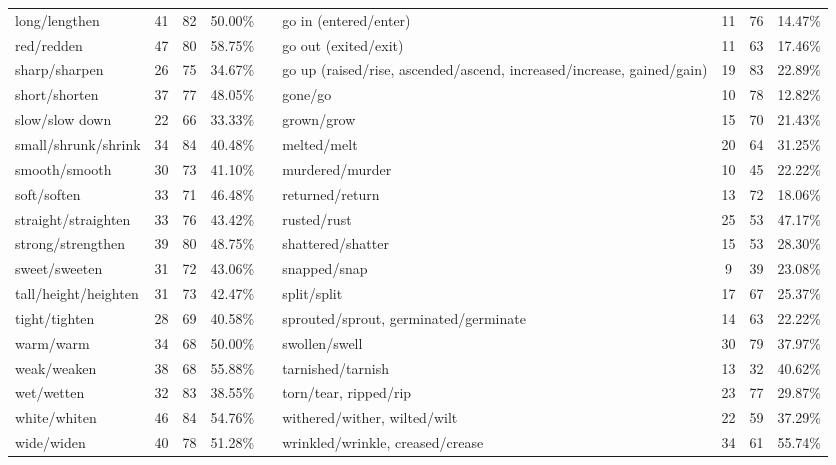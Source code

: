 \begin{tabular}{p{3cm}ccccp{3cm}ccc}
long/lengthen & 41 & 82 & 50.00\% & & go in (entered/enter) & 11 & 76 & 14.47\% \\
red/redden & 47 & 80 & 58.75\% & & go out (exited/exit) & 11 & 63 & 17.46\% \\
sharp/sharpen & 26 & 75 & 34.67\% & & go up (raised/rise, ascended/ascend, increased/increase, gained/gain) & 19 & 83 & 22.89\% \\
short/shorten & 37 & 77 & 48.05\% & & gone/go & 10 & 78 & 12.82\% \\
slow/slow down & 22 & 66 & 33.33\% & & grown/grow & 15 & 70 & 21.43\% \\
small/shrunk/shrink & 34 & 84 & 40.48\% & & melted/melt & 20 & 64 & 31.25\% \\
smooth/smooth & 30 & 73 & 41.10\% & & murdered/murder & 10 & 45 & 22.22\% \\
soft/soften & 33 & 71 & 46.48\% & & returned/return & 13 & 72 & 18.06\% \\
straight/straighten & 33 & 76 & 43.42\% & & rusted/rust & 25 & 53 & 47.17\% \\
strong/strengthen & 39 & 80 & 48.75\% & & shattered/shatter & 15 & 53 & 28.30\% \\
sweet/sweeten & 31 & 72 & 43.06\% & & snapped/snap & 9 & 39 & 23.08\% \\
tall/height/heighten & 31 & 73 & 42.47\% & & split/split & 17 & 67 & 25.37\% \\
tight/tighten & 28 & 69 & 40.58\% & & sprouted/sprout, germinated/germinate & 14 & 63 & 22.22\% \\
warm/warm & 34 & 68 & 50.00\% & & swollen/swell & 30 & 79 & 37.97\% \\
weak/weaken & 38 & 68 & 55.88\% & & tarnished/tarnish & 13 & 32 & 40.62\% \\
wet/wetten & 32 & 83 & 38.55\% & & torn/tear, ripped/rip & 23 & 77 & 29.87\% \\
white/whiten & 46 & 84 & 54.76\% & & withered/wither, wilted/wilt & 22 & 59 & 37.29\% \\
wide/widen & 40 & 78 & 51.28\% & & wrinkled/wrinkle, creased/crease & 34 & 61 & 55.74\%
\end{tabular}